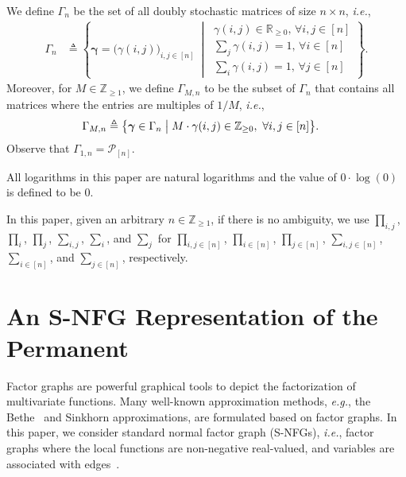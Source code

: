 \documentclass[journal,lettersize,twocolumn]{IEEEtran} %
\newcommand{\vect}[1]{ \bm{#1} }
\newcommand{\set}[1]{\mathcal{#1}}
\newcommand{\vgam}{ \vect{\gamma} }
\newcommand{\sR}{\mathbb{R}}
\newcommand{\sZ}{\mathbb{Z}}
\newcommand{\sZpp}{\mathbb{Z}_{\geq 1}}
\newcommand{\defeq}{ \triangleq }
\newcommand{\setP}{\set{P}}
\newcommand{\sZp}{\sZ_{\geq 0}}
\newcommand{\eg}{\textit{e.g.}}
\newcommand{\ie}{\textit{i.e.}}
\begin{document}
%

We define $\Gamma_n$ be the set of all doubly stochastic
matrices of size $n \times n$, \ie,
\begin{align*}
  \Gamma_n
    &\defeq
       \left\{ 
         \vgam
         = \bigl(
             \gamma(i,j)
           \bigr)_{i,j \in [n]}
      \ \middle| \ 
        \begin{array}{l}
          \gamma(i,j) \in \sR_{\geq 0}, \, \forall i,j \in [n] \\
          \sum_{j} \gamma(i,j) = 1, \, \forall i \in [n] \\
          \sum_{i} \gamma(i,j) = 1, \, \forall j \in [n]
        \end{array}
      \right\}.
\end{align*}
Moreover, for $M \in \sZpp$, we define $\Gamma_{M,n}$ to be the subset of
$\Gamma_{n}$ that contains all matrices where the entries are multiples of
$1/M$, \ie,
\begin{align*}
  \Gamma_{M,n} 
    &\defeq 
       \bigl\{ 
         \vgam \in \Gamma_n
       \bigm|
         M \cdot \gamma(i,j) \in \sZp, \ \forall i,j \in [n]
       \bigr\}.
\end{align*}
Observe that $\Gamma_{1,n} = \setP_{[n]}$.

%

All logarithms in this paper are natural logarithms and the value of
$0 \cdot \log(0)$ is defined to be $ 0 $.

%

In this paper, given an arbitrary $ n \in \sZpp $, if there is no ambiguity,
we use $ \prod_{i,j} $, $ \prod_{i} $, $ \prod_{j} $, $ \sum_{i,j} $,
$ \sum_{i} $, and $ \sum_{j} $ for $ \prod_{i,j \in [n]} $, $ \prod_{i \in [n]} $,
$ \prod_{j \in [n]} $, $ \sum_{i,j \in [n]} $, $ \sum_{i \in [n]} $, and
$ \sum_{j \in [n]} $, respectively.

%
%

\ifx\withclearpagecommands\x
\clearpage
\fi

\section{An S-NFG Representation of the Permanent}
\label{sec:1}

%
%

Factor graphs are powerful graphical tools to depict the factorization of
multivariate functions. Many well-known approximation methods, \eg, the
Bethe~\cite{Yedidia2005} and Sinkhorn\cite{Linial2000} approximations, are
formulated based on factor graphs. In this paper, we consider standard normal
factor graph (S-NFGs), \ie, factor graphs where the local functions are
non-negative real-valued, and variables are associated with
edges~\cite{Forney2001, Loeliger2004a}.
\end{document}
